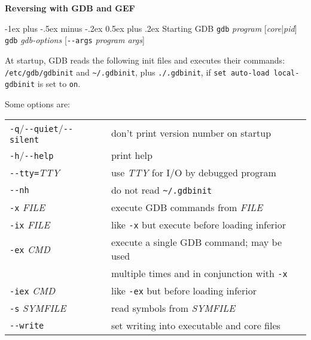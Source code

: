 \documentclass[a4paper,landscape]{article}
\makeatletter
\renewcommand{\section}{\@startsection{section}{1}{0mm}%
                                {-1ex plus -.5ex minus -.2ex}%
                                {0.5ex plus .2ex}%
                                {\normalfont\large\bfseries}}
\makeatother
\begin{document}
\footnotesize
\begin{multicols*}{3}
\setlength{\premulticols}{1pt}
\setlength{\postmulticols}{1pt}
\setlength{\multicolsep}{1pt}
\setlength{\columnsep}{2pt}

\begin{center}
     \Large{\textbf{Reversing with GDB and GEF}} \\
\end{center}

\section{Starting GDB}
\texttt{gdb}\textit{ program }[\textit{core}|\textit{pid}] \\
\texttt{gdb}\textit{ gdb-options }[\texttt{-{}-args}\textit{ program args}]

At startup, GDB reads the following init files and executes their commands:
\texttt{/etc/gdb/gdbinit} and \texttt{\textasciitilde/.gdbinit}, plus \texttt{./.gdbinit},
if \texttt{set auto-load local-gdbinit} is set to \texttt{on}.

Some options are:\\
\begin{tabular}{@{}ll@{}}
\texttt{-q}/\texttt{-{}-quiet}/\texttt{-{}-silent} & don't print version number on startup \\
\texttt{-h}/\texttt{-{}-help} & print help \\
\texttt{-{}-tty=}\textit{TTY} & use \textit{TTY} for I/O by debugged program \\
\texttt{-{}-nh} & do not read \texttt{\textasciitilde/.gdbinit} \\
\texttt{-x}\textit{ FILE} & execute GDB commands from \textit{FILE} \\
\texttt{-ix}\textit{ FILE} & like \texttt{-x} but execute before loading inferior \\
\texttt{-ex}\textit{ CMD} & execute a single GDB command; may be used \\ & multiple times and in conjunction with \texttt{-x} \\
\texttt{-iex}\textit{ CMD} & like \texttt{-ex} but before loading inferior \\
\texttt{-s}\textit{ SYMFILE} & read symbols from \textit{SYMFILE} \\
\texttt{-{}-write} & set writing into executable and core files \\
\end{tabular}


\end{multicols*}
\end{document}

